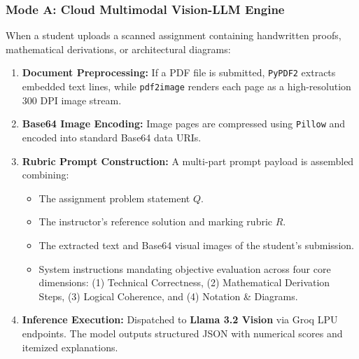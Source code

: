 \subsubsection{Mode A: Cloud Multimodal Vision-LLM Engine}
When a student uploads a scanned assignment containing handwritten proofs, mathematical derivations, or architectural diagrams:
\begin{enumerate}[leftmargin=*]
    \item \textbf{Document Preprocessing:} If a PDF file is submitted, \texttt{PyPDF2} extracts embedded text lines, while \texttt{pdf2image} renders each page as a high-resolution 300 DPI image stream.
    \item \textbf{Base64 Image Encoding:} Image pages are compressed using \texttt{Pillow} and encoded into standard Base64 data URIs.
    \item \textbf{Rubric Prompt Construction:} A multi-part prompt payload is assembled combining:
    \begin{itemize}
        \item The assignment problem statement $Q$.
        \item The instructor's reference solution and marking rubric $R$.
        \item The extracted text and Base64 visual images of the student's submission.
        \item System instructions mandating objective evaluation across four core dimensions: (1) Technical Correctness, (2) Mathematical Derivation Steps, (3) Logical Coherence, and (4) Notation \& Diagrams.
    \end{itemize}
    \item \textbf{Inference Execution:} Dispatched to \textbf{Llama 3.2 Vision} via Groq LPU endpoints. The model outputs structured JSON with numerical scores and itemized explanations.
\end{enumerate}

